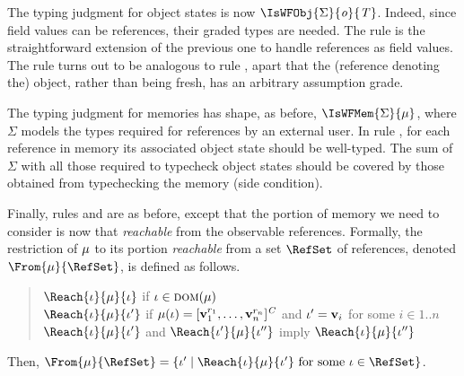 \bez
The typing judgment for object states is now $\IsWFObj{\Sigma}{\obj}{\T}$. Indeed, since field values can be references, their graded types are needed. The rule is the straightforward extension of the previous one to handle references as field values.  The rule turns out to be analogous to rule , apart that the (reference denoting the) object, rather than being fresh, has an arbitrary assumption grade.
\eez
 
The typing judgment for memories has shape, as before, $\IsWFMem{\Sigma}{\mem}$, where $\Sigma$ models the types required for references  by an external user.
In rule , for each reference in memory its associated object state should be well-typed. The sum of $\Sigma$ with 
all those required to typecheck object states should be covered by those obtained from typechecking the memory (side condition). 


Finally, rules  and  are as before, except that the portion of memory we need to consider is now that \emph{reachable} from the observable references. Formally, the restriction of $\mu$ to its portion \emph{reachable} from a set $\RefSet$ of references, denoted  $\From{\mem}{\RefSet}$, is defined as follows. 
\begin{quote}
$\Reach{\loc}{\mem}{\loc}$ if $\iota\in\textsc{dom}(\mu)$\\
$\Reach{\loc}{\mem}{\loc'}$ if $\mu(\iota)=[\mathbf{v}_{1}^{r_{1}},\ldots,\mathbf{v}_{n}^{r_{n}}]^{\mathit{C}}$ and $\iota'=\mathbf{v}_i$ for some $i\in 1..n$\\
$\Reach{\loc}{\mem}{\loc'}$ and $\Reach{\loc'}{\mem}{\loc''}$ imply $\Reach{\loc}{\mem}{\loc''}$
\end{quote}
Then, $\From{\mem}{\RefSet}=\{\loc'\mid\Reach{\loc}{\mem}{\loc'}\ \mbox{for some}\ \loc\in\RefSet\}$.

















